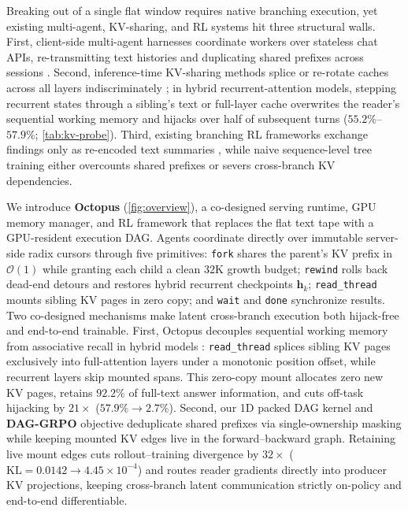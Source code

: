 \documentclass{article}
\begin{document}
Breaking out of a single flat window requires native branching execution, yet existing multi-agent, KV-sharing, and RL systems hit three structural walls. First, client-side multi-agent harnesses coordinate workers over stateless chat APIs, re-transmitting text histories and duplicating shared prefixes across sessions \citep{li2023camel, wu2023autogen, hong2023metagpt, khatua2026cooperbench}. Second, inference-time KV-sharing methods splice or re-rotate caches across all layers indiscriminately \citep{yao2025cacheblend, rodionov2025hogwild, ye2025kvcomm, jeon2026kvcmas}; in hybrid recurrent-attention models, stepping recurrent states through a sibling's text or full-layer cache overwrites the reader's sequential working memory and hijacks over half of subsequent turns ($55.2\%$--$57.9\%$; \cref{tab:kv-probe}). Third, existing branching RL frameworks exchange findings only as re-encoded text summaries \citep{pan2025apr, sun2025contextfolding, hong2025mgrpo}, while naive sequence-level tree training either overcounts shared prefixes or severs cross-branch KV dependencies.

We introduce \textbf{Octopus} (\cref{fig:overview}), a co-designed serving runtime, GPU memory manager, and RL framework that replaces the flat text tape with a GPU-resident execution DAG. Agents coordinate directly over immutable server-side radix cursors through five primitives: \texttt{fork} shares the parent's KV prefix in $\mathcal{O}(1)$ while granting each child a clean $32\text{K}$ growth budget; \texttt{rewind} rolls back dead-end detours and restores hybrid recurrent checkpoints $\mathbf{h}_k$; \texttt{read\_thread} mounts sibling KV pages in zero copy; and \texttt{wait} and \texttt{done} synchronize results. Two co-designed mechanisms make latent cross-branch execution both hijack-free and end-to-end trainable. First, Octopus decouples sequential working memory from associative recall in hybrid models \citep{afendulev2026attention}: \texttt{read\_thread} splices sibling KV pages exclusively into full-attention layers under a monotonic position offset, while recurrent layers skip mounted spans. This zero-copy mount allocates zero new KV pages, retains $92.2\%$ of full-text answer information, and cuts off-task hijacking by $21\times$ ($57.9\% \to 2.7\%$). Second, our 1D packed DAG kernel and \textbf{DAG-GRPO} objective deduplicate shared prefixes via single-ownership masking while keeping mounted KV edges live in the forward--backward graph. Retaining live mount edges cuts rollout--training divergence by $32\times$ ($\mathrm{KL} = 0.0142 \to 4.45 \times 10^{-4}$) and routes reader gradients directly into producer KV projections, keeping cross-branch latent communication strictly on-policy and end-to-end differentiable.
\end{document}
